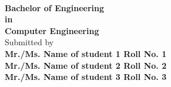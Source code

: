 \begin{center}
{\LARGE \bf {}} \\
\vspace{1in}
\Large{\bf{Bachelor of Engineering}}\\
\vspace{-0.1in}
{\bf in}\\
\vspace{-0.1in}
\Large{\bf{Computer Engineering}}\\
\vspace{0.3in}
\Large Submitted by\\
\vspace{0.1in}
{\Large \bf Mr./Ms. Name of student 1 \hspace{0.05in} Roll No. 1}\\
{\Large \bf Mr./Ms. Name of student 2 \hspace{0.15in} Roll No. 2}\\
{\Large \bf Mr./Ms. Name of student 3 \hspace{0.15in} Roll No. 3}\\


\end{center}
